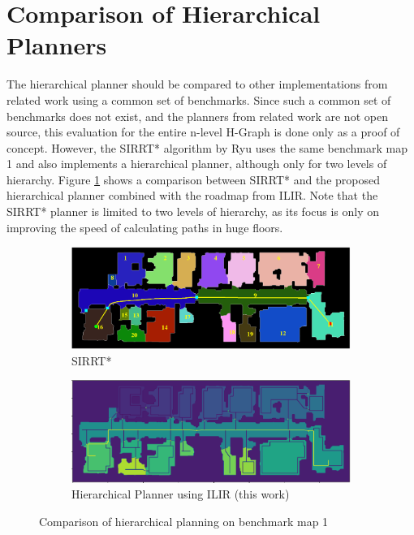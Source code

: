 \section{Comparison of Hierarchical Planners}
\label{sec:evaluation_hierarchical}
The hierarchical planner should be compared to other implementations from related work using a common set of benchmarks. Since such a common set of benchmarks does not exist, and the planners from related work are not open source, this evaluation for the entire n-level H-Graph is done only as a proof of concept. However, the SIRRT* algorithm by Ryu \cite{ryu_hierarchical_2020} uses the same benchmark map 1 and also implements a hierarchical planner, although only for two levels of hierarchy. Figure \ref{fig:ryu_floor_comparison} shows a comparison between SIRRT* and the proposed hierarchical planner combined with the roadmap from ILIR. Note that the SIRRT* planner is limited to two levels of hierarchy, as its focus is only on improving the speed of calculating paths in huge floors. 

\begin{figure}[h]
    \captionsetup[subfigure]{justification=centering}
    \centering
    \begin{subfigure}{0.75\textwidth}
      \centering
      \includegraphics[width=\textwidth]{figures/60_results/ryu_example_path_htm.png}
      \caption{SIRRT* \cite{ryu_hierarchical_2020}}
    \end{subfigure}
    \begin{subfigure}{0.75\textwidth}
      \centering
      \includegraphics[width=\textwidth]{figures/60_results/ryu_example_path_ilir.png}
      \caption{Hierarchical Planner using ILIR (this work)}
    \end{subfigure}
    \caption[Comparison of hierarchical planning on benchmark map 1]{Comparison of hierarchical planning on benchmark map 1}
    \label{fig:ryu_floor_comparison}
\end{figure}


